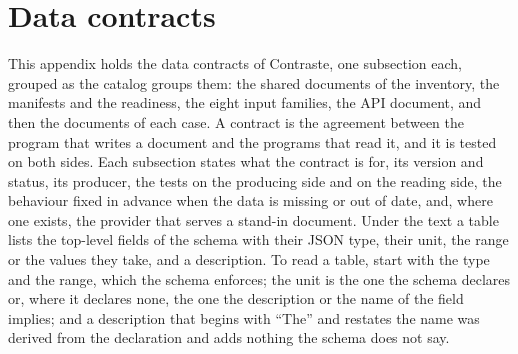 \section{Data contracts}
\label{sec:contracts}

This appendix holds the \rsContracts{} data contracts of Contraste, one subsection each, grouped as the catalog groups them: the shared documents of the inventory, the manifests and the readiness, the eight input families, the API document, and then the documents of each case. A contract is the agreement between the program that writes a document and the programs that read it, and it is tested on both sides. Each subsection states what the contract is for, its version and status, its producer, the tests on the producing side and on the reading side, the behaviour fixed in advance when the data is missing or out of date, and, where one exists, the provider that serves a stand-in document. Under the text a table lists the top-level fields of the schema with their JSON type, their unit, the range or the values they take, and a description. To read a table, start with the type and the range, which the schema enforces; the unit is the one the schema declares or, where it declares none, the one the description or the name of the field implies; and a description that begins with ``The'' and restates the name was derived from the declaration and adds nothing the schema does not say.

